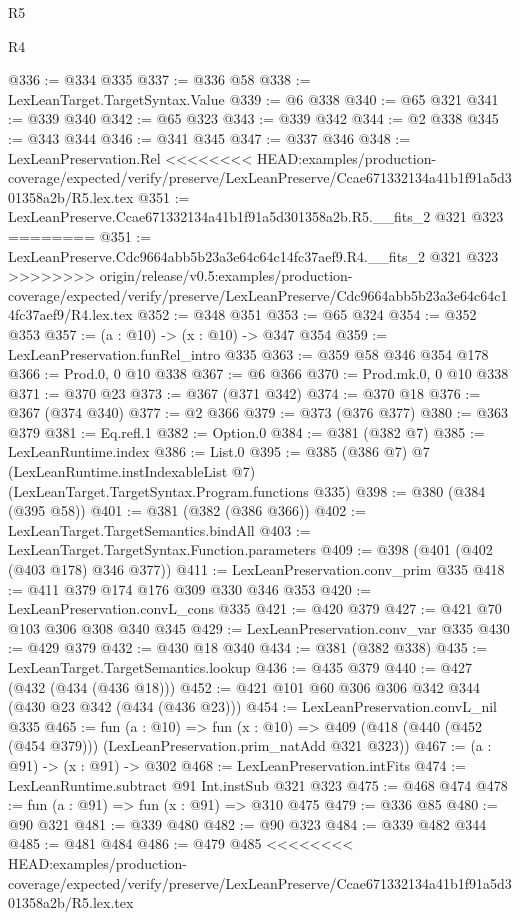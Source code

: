 \begin{lexlean}{R5}
\begin{lexlean}{R4}
\begin{coremodule}
{{{{{{{{{{{{{{{{{{{{@336 := @334 @335
@337 := @336 @58
@338 := LexLeanTarget.TargetSyntax.Value
@339 := @6 @338
@340 := @65 @321
@341 := @339 @340
@342 := @65 @323
@343 := @339 @342
@344 := @2 @338
@345 := @343 @344
@346 := @341 @345
@347 := @337 @346
@348 := LexLeanPreservation.Rel
<<<<<<<< HEAD:examples/production-coverage/expected/verify/preserve/LexLeanPreserve/Ccae671332134a41b1f91a5d301358a2b/R5.lex.tex
@351 := LexLeanPreserve.Ccae671332134a41b1f91a5d301358a2b.R5.__fits_2 @321 @323
========
@351 := LexLeanPreserve.Cdc9664abb5b23a3e64c64c14fc37aef9.R4.__fits_2 @321 @323
>>>>>>>> origin/release/v0.5:examples/production-coverage/expected/verify/preserve/LexLeanPreserve/Cdc9664abb5b23a3e64c64c14fc37aef9/R4.lex.tex
@352 := @348 @351
@353 := @65 @324
@354 := @352 @353
@357 := (a : @10) -> (x : @10) -> @347 @354
@359 := LexLeanPreservation.funRel_intro @335
@363 := @359 @58 @346 @354 @178
@366 := Prod.{0, 0} @10 @338
@367 := @6 @366
@370 := Prod.mk.{0, 0} @10 @338
@371 := @370 @23
@373 := @367 (@371 @342)
@374 := @370 @18
@376 := @367 (@374 @340)
@377 := @2 @366
@379 := @373 (@376 @377)
@380 := @363 @379
@381 := Eq.refl.{1}
@382 := Option.{0}
@384 := @381 (@382 @7)
@385 := LexLeanRuntime.index
@386 := List.{0}
@395 := @385
    (@386 @7)
    @7
    (LexLeanRuntime.instIndexableList @7)
    (LexLeanTarget.TargetSyntax.Program.functions @335)
@398 := @380 (@384 (@395 @58))
@401 := @381 (@382 (@386 @366))
@402 := LexLeanTarget.TargetSemantics.bindAll
@403 := LexLeanTarget.TargetSyntax.Function.parameters
@409 := @398 (@401 (@402 (@403 @178) @346 @377))
@411 := LexLeanPreservation.conv_prim @335
@418 := @411 @379 @174 @176 @309 @330 @346 @353
@420 := LexLeanPreservation.convL_cons @335
@421 := @420 @379
@427 := @421 @70 @103 @306 @308 @340 @345
@429 := LexLeanPreservation.conv_var @335
@430 := @429 @379
@432 := @430 @18 @340
@434 := @381 (@382 @338)
@435 := LexLeanTarget.TargetSemantics.lookup
@436 := @435 @379
@440 := @427 (@432 (@434 (@436 @18)))
@452 := @421 @101 @60 @306 @306 @342 @344 (@430 @23 @342 (@434 (@436 @23)))
@454 := LexLeanPreservation.convL_nil @335
@465 := fun (a : @10) =>
  fun (x : @10) => @409 (@418 (@440 (@452 (@454 @379))) (LexLeanPreservation.prim_natAdd @321 @323))
@467 := (a : @91) -> (x : @91) -> @302
@468 := LexLeanPreservation.intFits
@474 := LexLeanRuntime.subtract @91 Int.instSub @321 @323
@475 := @468 @474
@478 := fun (a : @91) => fun (x : @91) => @310 @475
@479 := @336 @85
@480 := @90 @321
@481 := @339 @480
@482 := @90 @323
@484 := @339 @482 @344
@485 := @481 @484
@486 := @479 @485
<<<<<<<< HEAD:examples/production-coverage/expected/verify/preserve/LexLeanPreserve/Ccae671332134a41b1f91a5d301358a2b/R5.lex.tex
}}}}}}}}}}}}}}}}}}}}
\end{coremodule}
\end{lexlean}
\end{lexlean}
